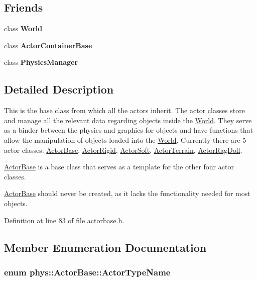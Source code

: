 \subsection*{Friends}
\begin{DoxyCompactItemize}
\item 
\hypertarget{classphys_1_1ActorBase_a7b4bcdf992c21ae83363f25df05b1d25}{
class {\bfseries World}}
\label{d8/d0f/classphys_1_1ActorBase_a7b4bcdf992c21ae83363f25df05b1d25}

\item 
\hypertarget{classphys_1_1ActorBase_a54042fcfa7ab444a50ec79cbe3395356}{
class {\bfseries ActorContainerBase}}
\label{d8/d0f/classphys_1_1ActorBase_a54042fcfa7ab444a50ec79cbe3395356}

\item 
\hypertarget{classphys_1_1ActorBase_a139cf05ac01161b7071c8a037c841683}{
class {\bfseries PhysicsManager}}
\label{d8/d0f/classphys_1_1ActorBase_a139cf05ac01161b7071c8a037c841683}

\end{DoxyCompactItemize}


\subsection{Detailed Description}
This is the base class from which all the actors inherit. The actor classes store and manage all the relevant data regarding objects inside the \hyperlink{classphys_1_1World}{World}. They serve as a binder between the physics and graphics for objects and have functions that allow the manipulation of objects loaded into the \hyperlink{classphys_1_1World}{World}. Currently there are 5 actor classes: \hyperlink{classphys_1_1ActorBase}{ActorBase}, \hyperlink{classphys_1_1ActorRigid}{ActorRigid}, \hyperlink{classphys_1_1ActorSoft}{ActorSoft}, \hyperlink{classphys_1_1ActorTerrain}{ActorTerrain}, \hyperlink{classphys_1_1ActorRagDoll}{ActorRagDoll}. \par
 \hyperlink{classphys_1_1ActorBase}{ActorBase} is a base class that serves as a template for the other four actor classes. \par
 \hyperlink{classphys_1_1ActorBase}{ActorBase} should never be created, as it lacks the functionality needed for most objects. 

Definition at line 83 of file actorbase.h.



\subsection{Member Enumeration Documentation}
\hypertarget{classphys_1_1ActorBase_aff3a7c464e8ce82576073f8f891434b7}{
\subsubsection[{ActorTypeName}]{\setlength{\rightskip}{0pt plus 5cm}enum {\bf phys::ActorBase::ActorTypeName}}}
\label{d8/d0f/classphys_1_1ActorBase_aff3a7c464e8ce82576073f8f891434b7}


